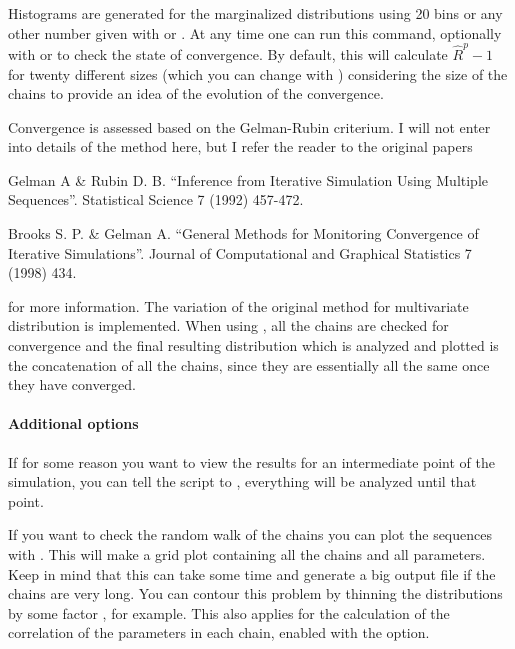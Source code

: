 \documentclass[letterpaper,12pt,english]{sphinxhowto}
\begin{document}
Histograms are generated for the marginalized distributions using 20 bins or
any other number given with  or .
At any time one can run this command, optionally with  or
  to check the state of convergence.
By default, this will calculate \(\hat R^p - 1\) for twenty
different sizes (which you can change with ) considering the size
of the chains to provide an idea of the evolution of the convergence.

Convergence is assessed based on the Gelman-Rubin criterium.
I will not enter into details of the method here, but I refer the reader to the
original papers %
\begin{footnote}[4]\sphinxAtStartFootnote
Gelman A \& Rubin D. B. “Inference from Iterative Simulation Using Multiple Sequences”. Statistical Science 7 (1992) 457-472.
%
\end{footnote} %
\begin{footnote}[5]\sphinxAtStartFootnote
Brooks S. P. \& Gelman A. “General Methods for Monitoring Convergence of Iterative Simulations”. Journal of Computational and Graphical Statistics 7 (1998) 434.
%
\end{footnote} for more information.
The variation of the original method for multivariate distribution is implemented.
When using , all the chains are checked for convergence and the final
resulting distribution which is analyzed and plotted is the concatenation of
all the chains, since they are essentially all the same once they have
converged.


\paragraph{Additional options}
\label{\detokenize{MCMC:additional-options}}
If for some reason you want to view the results for an intermediate point of
the simulation, you can tell the script to , everything will
be analyzed until that point.

If you want to check the random walk of the chains you can plot the sequences
with . This will make a grid plot containing all the chains
and all parameters. Keep in mind that this can take some time and generate a
big output file if the chains are very long. You can contour this problem by
thinning the distributions by some factor , for example.
This also applies for the calculation of the correlation of the parameters in
each chain, enabled with the  option.
\end{document}
